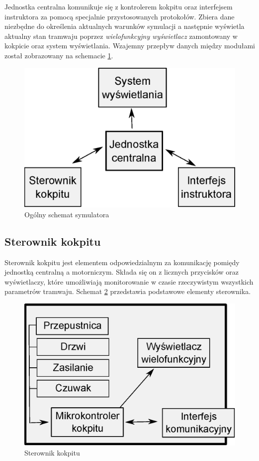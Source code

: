 \documentclass[12pt,a4paper]{article}
\begin{document}
Jednostka centralna komunikuje się z kontrolerem kokpitu oraz interfejsem instruktora za pomocą
specjalnie przystosowanych protokołów. Zbiera dane niezbędne do określenia aktualnych warunków
symulacji a następnie wyświetla aktualny stan tramwaju poprzez {\it wielofunkcyjny wyświetlacz}
zamontowany w kokpicie oraz system wyświetlania. Wzajemny przepływ danych między modułami został
zobrazowany na schemacie \ref{jeden}.
\begin{figure}[h]
	\begin{center}
		\includegraphics[scale=0.5]{img/jeden.eps}
		\caption{Ogólny schemat symulatora}
		\label{jeden}
	\end{center}
\end{figure}

\subsection{Sterownik kokpitu}
Sterownik kokpitu jest elementem odpowiedzialnym za komunikację pomiędy jednostką centralną a
motorniczym. Składa się on z licznych przycisków oraz wyświetlaczy, które umożliwiają monitorowanie
w czasie rzeczywistym wszystkich parametrów tramwaju. Schemat \ref{dwa} przedstawia podstawowe
elementy sterownika. 
\begin{figure}[h]
	\begin{center}
		\includegraphics[scale=0.5]{img/dwa.eps}
		\caption{Sterownik kokpitu}
		\label{dwa}
	\end{center}
\end{figure}
\end{document}
